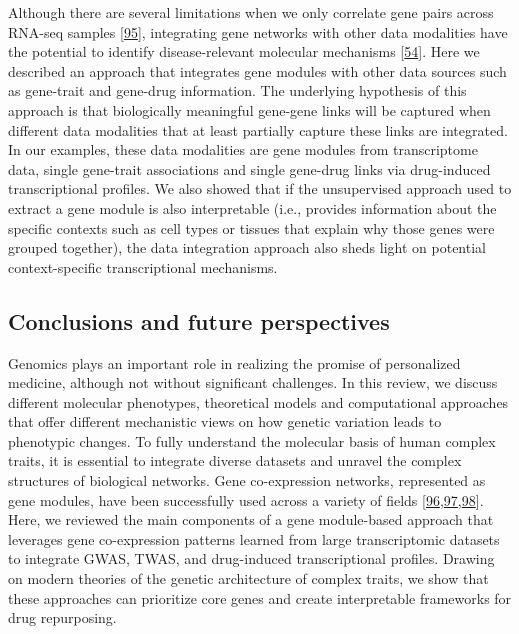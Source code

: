 Although there are several limitations when we only correlate gene pairs across RNA-seq samples {[}\protect\hyperlink{ref-jVQ2rMqc}{95}{]}, integrating gene networks with other data modalities have the potential to identify disease-relevant molecular mechanisms {[}\protect\hyperlink{ref-dg9nKuy0}{54}{]}.
Here we described an approach that integrates gene modules with other data sources such as gene-trait and gene-drug information.
The underlying hypothesis of this approach is that biologically meaningful gene-gene links will be captured when different data modalities that at least partially capture these links are integrated.
In our examples, these data modalities are gene modules from transcriptome data, single gene-trait associations and single gene-drug links via drug-induced transcriptional profiles.
We also showed that if the unsupervised approach used to extract a gene module is also interpretable (i.e., provides information about the specific contexts such as cell types or tissues that explain why those genes were grouped together), the data integration approach also sheds light on potential context-specific transcriptional mechanisms.

\hypertarget{conclusions-and-future-perspectives}{%
\subsection{Conclusions and future perspectives}\label{conclusions-and-future-perspectives}}

Genomics plays an important role in realizing the promise of personalized medicine, although not without significant challenges.
In this review, we discuss different molecular phenotypes, theoretical models and computational approaches that offer different mechanistic views on how genetic variation leads to phenotypic changes.
To fully understand the molecular basis of human complex traits, it is essential to integrate diverse datasets and unravel the complex structures of biological networks.
Gene co-expression networks, represented as gene modules, have been successfully used across a variety of fields {[}\protect\hyperlink{ref-CqvNaEqc}{96},\protect\hyperlink{ref-r8alvfcC}{97},\protect\hyperlink{ref-E1tpJnqG}{98}{]}.
Here, we reviewed the main components of a gene module-based approach that leverages gene co-expression patterns learned from large transcriptomic datasets to integrate GWAS, TWAS, and drug-induced transcriptional profiles.
Drawing on modern theories of the genetic architecture of complex traits, we show that these approaches can prioritize core genes and create interpretable frameworks for drug repurposing.

